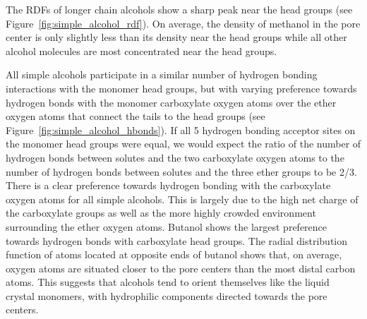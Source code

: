 \documentclass[journal=jpcbfk,manuscript=article]{achemso}
\begin{document}
  The RDFs of longer chain alcohols show a sharp peak near the head groups 
  (see Figure~\ref{fig:simple_alcohol_rdf}). On average, the density of methanol
  in the pore center is only slightly less than its density near the head 
  groups while all other alcohol molecules are most concentrated near the head
  groups.
  
  
  All simple alcohols participate in a similar number of hydrogen bonding 
  interactions with the monomer head groups, but with varying preference towards
  hydrogen bonds with the monomer carboxylate oxygen atoms over the ether oxygen
  atoms that connect the tails to the head groups (see Figure~\ref{fig:simple_alcohol_hbonds}).
  If all 5 hydrogen bonding acceptor sites on the monomer head groups were equal,
  we would expect the ratio of the number of hydrogen bonds between solutes and
  the two carboxylate oxygen atoms to the number of hydrogen bonds between solutes
  and the three ether groups to be 2/3. There is a clear preference towards 
  hydrogen bonding with the carboxylate oxygen atoms for all simple alcohols. 
  This is largely due to the high net charge of the carboxylate groups as well
  as the more highly crowded environment surrounding the ether oxygen atoms. 
  Butanol shows the largest preference towards hydrogen bonds with carboxylate
  head groups. The radial distribution function of atoms located at opposite ends
  of butanol shows that, on average, oxygen atoms are situated closer to the pore
  centers than the most distal carbon atoms. This suggests that alcohols tend to 
  orient themselves like the liquid crystal monomers, with hydrophilic components
  directed towards the pore centers.
  
\end{document}
